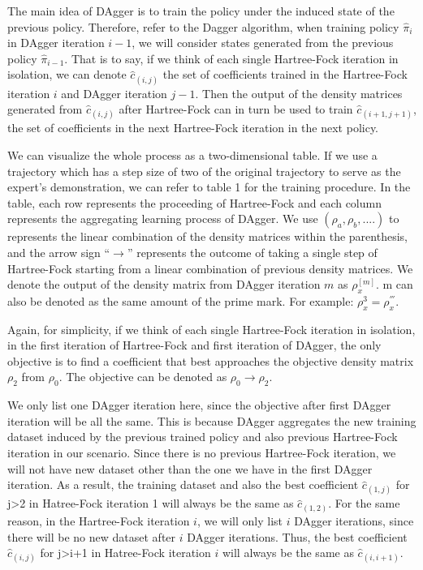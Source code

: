 \documentclass[twoside]{article}
\begin{document}
The main idea of DAgger is to train the policy under the induced state of the previous policy. Therefore, refer to the Dagger algorithm, when training policy $\hat{\pi}_{i}$ in DAgger iteration $i-1$,
we will consider states generated from the previous policy $\hat{\pi}_{i-1}$. That is to say, if we think of each single Hartree-Fock iteration in isolation, we can denote $\hat{c}_{(i,j)}$ the set of coefficients trained in the Hartree-Fock iteration $i$ and DAgger iteration $j-1$. Then the output of the density matrices generated from $\hat{c}_{(i,j)}$ after Hartree-Fock can in turn be used to train $\hat{c}_{(i+1,j+1)}$, the set of coefficients in the next Hartree-Fock iteration in the next policy.


We can visualize the whole process as a two-dimensional table. If we use a trajectory which has a step size of two of the original trajectory to serve as the expert's demonstration, we can refer to table 1 for the training procedure.
In the table, each row represents the proceeding of Hartree-Fock and each column represents the aggregating learning process of DAgger. We use $(\rho_a, \rho_b, ....)$ to represents the linear combination of the density matrices within the parenthesis, and the arrow sign ``$\rightarrow$'' represents the outcome of taking a single step of Hartree-Fock starting from a linear combination of previous density matrices. We denote the output of the density matrix from DAgger iteration $m$ as $\rho_x^{[m]}$. m can also be denoted as the same amount of the prime mark. For example: $\rho_x^{3} = \rho_x^{'''}$.

Again, for simplicity, if we think of each single Hartree-Fock iteration in isolation, in the first iteration of Hartree-Fock and first iteration of DAgger, the only objective is to find a coefficient that best approaches the objective density matrix $\rho_2$ from  $\rho_0$. The objective can be denoted as $\rho_0 \rightarrow \rho_2$. 

We only list one DAgger iteration here, since the objective after first DAgger iteration will be all the same. This is because DAgger aggregates the new training dataset induced by the previous trained policy and also previous Hartree-Fock iteration in our scenario. Since there is no previous Hartree-Fock iteration, we will not have new dataset other than the one we have in the first DAgger iteration. As a result, the training dataset and also the best coefficient $\hat{c}_{(1,j)}$ for j>2 in Hatree-Fock iteration 1 will always be the same as $\hat{c}_{(1,2)}$. For the same reason, in the Hartree-Fock iteration $i$, we will only list $i$ DAgger iterations, since there will be no new dataset after $i$ DAgger iterations. Thus, the best coefficient $\hat{c}_{(i,j)}$ for j>i+1 in Hatree-Fock iteration $i$ will always be the same as $\hat{c}_{(i,i+1)}$.
\end{document}
